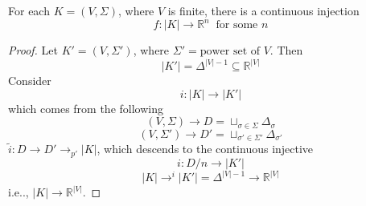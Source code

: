 \begin{proposition}
For each $K=(V,\Sigma)$, where $V$ is finite, there is a continuous injection
\[
f:|K|\to\mathbb{R}^n\ \text{ for some $n$}
\]
\end{proposition}
\begin{proof}
Let $K'=(V,\Sigma')$, where $\Sigma'=\text{power set of $V$}$. Then
\[
|K'| = \Delta^{|V|-1}\subseteq \mathbb{R}^{|V|}
\]
Consider
\[
i:|K|\to|K'|
\]
which comes from the following
\[
(V,\Sigma)\to D=\sqcup_{\sigma\in \Sigma}\Delta_{\sigma}
\]
\[
(V,\Sigma')\to D'=\sqcup_{\sigma'\in \Sigma'}\Delta_{\sigma'}
\]
$\tilde{i}:D\to D'\to_{p'}|K|$, which descends to the continuous injective
\[
i:D/n\to|K'|
\]
\[
|K|\to^i|K'|=\Delta^{|V|-1}\to\mathbb{R}^{|V|}
\]
i.e.., $|K|\to\mathbb{R}^{|V|}$.
\end{proof}














